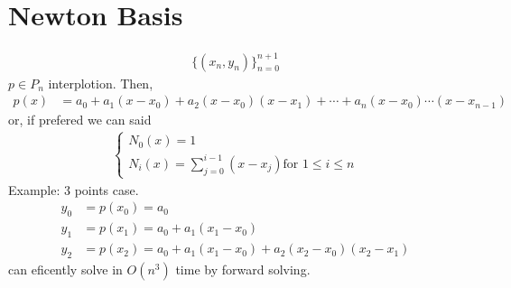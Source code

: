 \documentclass[11pt,oneside]{book}
\theoremstyle{break}
\theoremstyle{break}
\newcommand{\example}{\color{purple}Example: \color{black}}
\begin{document}
\section[Newton Basis]{Newton Basis} 
\begin{align*}
\{(x_n,y_n)\}_{n=0}^{n+1}
\end{align*}
$p\in P_n$ interplotion. Then, \begin{align*}
p(x)&=a_0+a_1(x-x_0)+a_2(x-x_0)(x-x_1)+\cdots+a_n(x-x_0)\cdots(x-x_{n-1})
\end{align*}
or, if prefered we can said \begin{align*}
\begin{cases}
N_0(x)=1\\
N_i(x)=\sum_{j=0}^{i-1}(x-x_j)\text{for }1\leq i\leq n
\end{cases}
\end{align*}
\example 3 points case.\\
\begin{align*}
y_0&=p(x_0)=a_0\\
y_1&=p(x_1)=a_0+a_1(x_1-x_0)\\
y_2&=p(x_2)=a_0+a_1(x_1-x_0)+a_2(x_2-x_0)(x_2-x_1)
\end{align*}
can eficently solve in $O(n^3)$ time by forward solving.\\
\hfill\\
\end{document}
